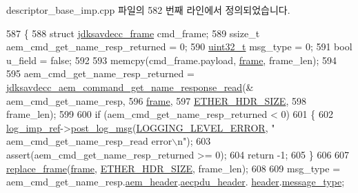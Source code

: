 descriptor\+\_\+base\+\_\+imp.\+cpp 파일의 582 번째 라인에서 정의되었습니다.


\begin{DoxyCode}
587 \{
588     \textcolor{keyword}{struct }\hyperlink{structjdksavdecc__frame}{jdksavdecc\_frame} cmd\_frame;
589     ssize\_t aem\_cmd\_get\_name\_resp\_returned = 0;
590     \hyperlink{parse_8c_a6eb1e68cc391dd753bc8ce896dbb8315}{uint32\_t} msg\_type = 0;
591     \textcolor{keywordtype}{bool} u\_field = \textcolor{keyword}{false};
592 
593     memcpy(cmd\_frame.payload, \hyperlink{gst__avb__playbin_8c_ac8e710e0b5e994c0545d75d69868c6f0}{frame}, frame\_len);
594 
595     aem\_cmd\_get\_name\_resp\_returned = 
      \hyperlink{group__command__get__name__response_ga0e8ecfaa03d14e2d8ade75cfec4d3bea}{jdksavdecc\_aem\_command\_get\_name\_response\_read}(&
      aem\_cmd\_get\_name\_resp,
596                                                                                    
      \hyperlink{gst__avb__playbin_8c_ac8e710e0b5e994c0545d75d69868c6f0}{frame},
597                                                                                    
      \hyperlink{namespaceavdecc__lib_a6c827b1a0d973e18119c5e3da518e65ca9512ad9b34302ba7048d88197e0a2dc0}{ETHER\_HDR\_SIZE},
598                                                                                    frame\_len);
599 
600     \textcolor{keywordflow}{if} (aem\_cmd\_get\_name\_resp\_returned < 0)
601     \{
602         \hyperlink{namespaceavdecc__lib_acbe3e2a96ae6524943ca532c87a28529}{log\_imp\_ref}->\hyperlink{classavdecc__lib_1_1log_a68139a6297697e4ccebf36ccfd02e44a}{post\_log\_msg}(\hyperlink{namespaceavdecc__lib_a501055c431e6872ef46f252ad13f85cdaf2c4481208273451a6f5c7bb9770ec8a}{LOGGING\_LEVEL\_ERROR}, \textcolor{stringliteral}{"
      aem\_cmd\_get\_name\_resp\_read error\(\backslash\)n"});
603         assert(aem\_cmd\_get\_name\_resp\_returned >= 0);
604         \textcolor{keywordflow}{return} -1;
605     \}
606 
607     \hyperlink{classavdecc__lib_1_1descriptor__base__imp_a482fe95208e9e14885e28e73e7be2c49}{replace\_frame}(\hyperlink{gst__avb__playbin_8c_ac8e710e0b5e994c0545d75d69868c6f0}{frame}, \hyperlink{namespaceavdecc__lib_a6c827b1a0d973e18119c5e3da518e65ca9512ad9b34302ba7048d88197e0a2dc0}{ETHER\_HDR\_SIZE}, frame\_len);
608 
609     msg\_type = aem\_cmd\_get\_name\_resp.\hyperlink{structjdksavdecc__aem__command__get__name__response_ae1e77ccb75ff5021ad923221eab38294}{aem\_header}.\hyperlink{structjdksavdecc__aecpdu__aem_ae8460ae179666e7ce268ed1ef33d0de3}{aecpdu\_header}.
      \hyperlink{structjdksavdecc__aecpdu__common_a314cacb6a61bcf18749030c0b6fb7510}{header}.\hyperlink{structjdksavdecc__aecpdu__common__control__header_aeaaffeace8c23899e558022f62ce6de4}{message\_type};

\end{DoxyCode}

